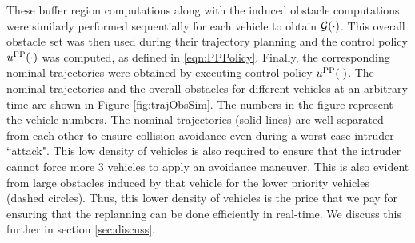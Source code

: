 These buffer region computations along with the induced obstacle computations were similarly performed sequentially for each vehicle to obtain $\mathcal{G}(\cdot)$. This overall obstacle set was then used during their trajectory planning and the control policy $u^{\text{PP}}(\cdot)$ was computed, as defined in \eqref{eqn:PPPolicy}. Finally, the corresponding nominal trajectories were obtained by executing control policy $u^{\text{PP}}(\cdot)$. %
The nominal trajectories and the overall obstacles for different vehicles at an arbitrary time are shown in Figure \ref{fig:trajObsSim}. The numbers in the figure represent the vehicle numbers. The nominal trajectories (solid lines) are well separated from each other to ensure collision avoidance even during a worst-case intruder ``attack". This low density of vehicles is also required to ensure that the intruder cannot force more 3 vehicles to apply an avoidance maneuver. This is also evident from large obstacles induced by that vehicle for the lower priority vehicles (dashed circles). Thus, this lower density of vehicles is the price that we pay for ensuring that the replanning can be done efficiently in real-time. We discuss this further in section \ref{sec:discuss}.
